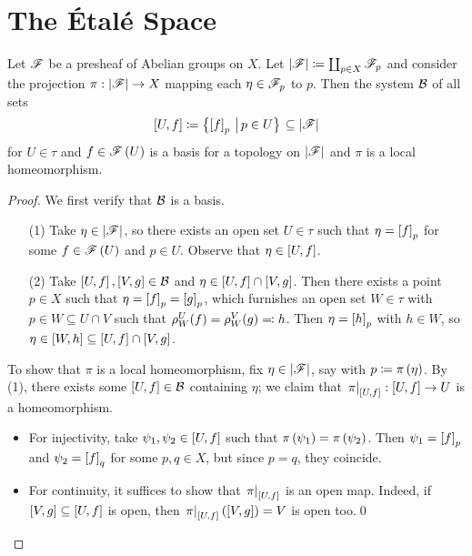 \documentclass[../Moduli_Spaces_of_Riemann_Surfaces.tex]{subfiles}
\begin{document}
    \section{The Étalé Space}
    \begin{proposition}\label{CS:prp:basis_stalk}
        Let $\mathscr{F}$ be a presheaf of Abelian groups on $X$. Let $\left|\mathscr{F}\right|\coloneqq\coprod_{p\in X}\mathscr{F}_p$ and consider the projection $\pi:\left|\mathscr{F}\right|\to X$ mapping each $\eta\in\mathscr{F}_p$ to $p$. Then the system $\mathcal{B}$ of all sets
        \begin{equation*}
            \left[U,f\right]\coloneqq\bigl\{\left[f\right]_p\,\left|\,p\in U\bigr\}\right.\subseteq\left|\mathscr{F}\right|
        \end{equation*}
        for $U\in\tau$ and $f\in\mathscr{F}\left(U\right)$ is a basis for a topology on $\left|\mathscr{F}\right|$ and $\pi$ is a local homeomorphism.
    \end{proposition}
    \begin{proof}
        We first verify that $\mathcal{B}$ is a basis.
        \begin{enumerate}
            \item[(1)] Take $\eta\in\left|\mathscr{F}\right|$, so there exists an open set $U\in\tau$ such that $\eta=\left[f\right]_p$ for some $f\in\mathscr{F}\left(U\right)$ and $p\in U$. Observe that $\eta\in\left[U,f\right]$.
            \item[(2)] Take $\left[U,f\right],\left[V,g\right]\in\mathcal{B}$ and $\eta\in\left[U,f\right]\cap\left[V,g\right]$. Then there exists a point $p\in X$ such that $\eta=\left[f\right]_p=\left[g\right]_p$, which furnishes an open set $W\in\tau$ with $p\in W\subseteq U\cap V$ such that $\rho^U_W\!\left(f\right)=\rho^V_W\!\left(g\right)\eqqcolon h$. Then $\eta=\left[h\right]_p$ with $h\in W$, so $\eta\in\left[W,h\right]\subseteq\left[U,f\right]\cap\left[V,g\right]$.
        \end{enumerate}
        To show that $\pi$ is a local homeomorphism, fix $\eta\in\left|\mathscr{F}\right|$, say with $p\coloneqq\pi\left(\eta\right)$. By (1), there exists some $\left[U,f\right]\in\mathcal{B}$ containing $\eta$; we claim that $\left.\pi\right|_{\left[U,f\right]}:\left[U,f\right]\to U$ is a homeomorphism.
        \begin{itemize}
            \item For injectivity, take $\psi_1,\psi_2\in\left[U,f\right]$ such that $\pi\left(\psi_1\right)=\pi\left(\psi_2\right)$. Then $\psi_1=\left[f\right]_p$ and $\psi_2=\left[f\right]_q$ for some $p,q\in X$, but since $p=q$, they coincide.
            \item For continuity, it suffices to show that $\left.\pi\right|_{\left[U,f\right]}$ is an open map. Indeed, if $\left[V,g\right]\subseteq\left[U,f\right]$ is open, then $\left.\pi\right|_{\left[U,f\right]}\left(\left[V,g\right]\right)=V$ is open too.\qed
        \end{itemize}
    \end{proof}
\end{document}
